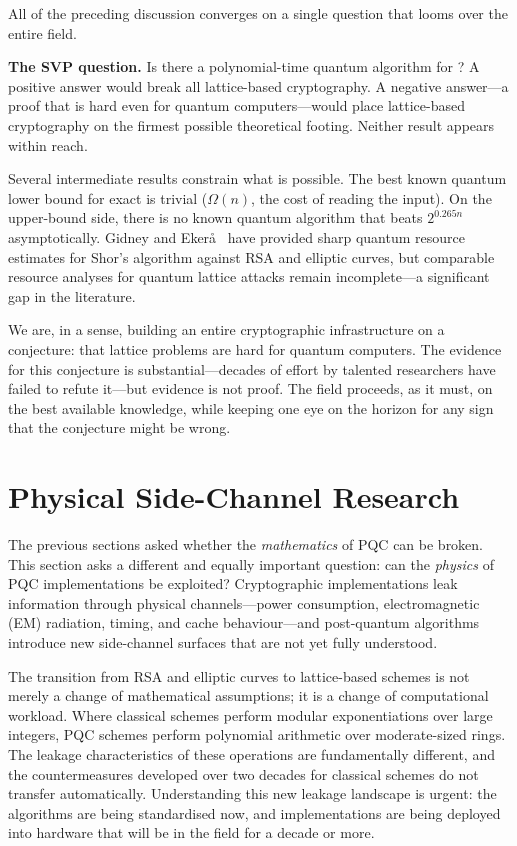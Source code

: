 All of the preceding discussion converges on a single question that looms over the entire field.

\begin{svgraybox}
\textbf{The SVP question.}
Is there a polynomial-time quantum algorithm for \svp{}?  A positive answer would break all lattice-based cryptography.  A negative answer---a proof that \svp{} is hard even for quantum computers---would place lattice-based cryptography on the firmest possible theoretical footing.  Neither result appears within reach.
\end{svgraybox}

Several intermediate results constrain what is possible.  The best known quantum lower bound for exact \svp{} is trivial ($\Omega(n)$, the cost of reading the input).  On the upper-bound side, there is no known quantum algorithm that beats $2^{0.265n}$ asymptotically.  Gidney and Eker\aa~\cite{GidneyEkera2021} have provided sharp quantum resource estimates for Shor's algorithm against RSA and elliptic curves, but comparable resource analyses for quantum lattice attacks remain incomplete---a significant gap in the literature.

We are, in a sense, building an entire cryptographic infrastructure on a conjecture: that lattice problems are hard for quantum computers.  The evidence for this conjecture is substantial---decades of effort by talented researchers have failed to refute it---but evidence is not proof.  The field proceeds, as it must, on the best available knowledge, while keeping one eye on the horizon for any sign that the conjecture might be wrong.


\section{Physical Side-Channel Research}
\label{sec:physical-research}

The previous sections asked whether the \emph{mathematics} of PQC can be broken.  This section asks a different and equally important question: can the \emph{physics} of PQC implementations be exploited?  Cryptographic implementations leak information through physical channels---power consumption, electromagnetic (EM) radiation, timing, and cache behaviour---and post-quantum algorithms introduce new side-channel surfaces that are not yet fully understood.

The transition from RSA and elliptic curves to lattice-based schemes is not merely a change of mathematical assumptions; it is a change of computational workload.  Where classical schemes perform modular exponentiations over large integers, PQC schemes perform polynomial arithmetic over moderate-sized rings.  The leakage characteristics of these operations are fundamentally different, and the countermeasures developed over two decades for classical schemes do not transfer automatically.  Understanding this new leakage landscape is urgent: the algorithms are being standardised now, and implementations are being deployed into hardware that will be in the field for a decade or more.

